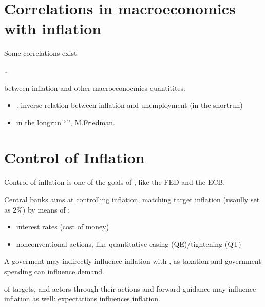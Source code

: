 \documentclass[letterpaper,10pt,english]{jupyterBook}
\begin{document}
\section{Correlations in macroeconomics with inflation}
\label{\detokenize{code/notebooks/inflation:correlations-in-macroeconomics-with-inflation}}\label{\detokenize{code/notebooks/inflation:fin-edu-inflation-correlations}}
\sphinxAtStartPar
Some correlations exist%
\begin{footnote}[1]\sphinxAtStartFootnote
…
%
\end{footnote} between inflation and other macroeconocmics quantitites.
\begin{itemize}
\item {} 
\sphinxAtStartPar
{}: inverse relation between inflation and unemployment (in the short\sphinxhyphen{}run)

\item {} 
\sphinxAtStartPar
{} in the long\sphinxhyphen{}run “”, M.Friedman.

\end{itemize}


\section{Control of Inflation}
\label{\detokenize{code/notebooks/inflation:control-of-inflation}}\label{\detokenize{code/notebooks/inflation:fin-edu-inflation-contro}}
\sphinxAtStartPar
Control of inflation is one of the goals of , like the FED and the ECB.

\sphinxAtStartPar
Central banks aims at controlling inflation, matching target inflation (usaully set as 2\%) by means of :
\begin{itemize}
\item {} 
\sphinxAtStartPar
interest rates (cost of money)

\item {} 
\sphinxAtStartPar
non\sphinxhyphen{}conventional actions, like quantitative easing (QE)/tightening (QT)

\end{itemize}

\sphinxAtStartPar
A goverment may indirectly influence inflation with , as taxation and government spending can influence demand.

\sphinxAtStartPar
{} of targets, and actors through their actions and forward guidance may influence inflation as well: expectations influences inflation.
\end{document}
